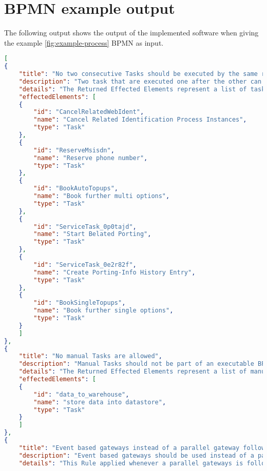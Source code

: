 \section{BPMN example output}\label{app-1}
The following output shows the output of the implemented software when giving the example \ref{fig:example-process} BPMN as input.
\begin{lstlisting}[breaklines=true, language=json]
[
{
	"title": "No two consecutive Tasks should be executed by the same resource",
	"description": "Two task that are executed one after the other can be merged if they have the same enitity executing the Task. In case of User tasks this means the same usergroup is executing this task. Automated Tasks that follow each other should also always be merged to minimize flownodes.",
	"details": "The Returned Effected Elements represent a list of tasks that can be merged with its direct successor.In case that three or more tasks can be merged, this algorithm will return every Task that can be mergedwith its successor on its own. Therefore if \"task1\" , \"task2\" and \"task3\" can be merged all together, this algorithm will \"task2\" and \"task3\" as effected elements",
	"effectedElements": [
	{
		"id": "CancelRelatedWebIdent",
		"name": "Cancel Related Identification Process Instances",
		"type": "Task"
	},
	{
		"id": "ReserveMsisdn",
		"name": "Reserve phone number",
		"type": "Task"
	},
	{
		"id": "BookAutoTopups",
		"name": "Book further multi options",
		"type": "Task"
	},
	{
		"id": "ServiceTask_0p0tajd",
		"name": "Start Belated Porting",
		"type": "Task"
	},
	{
		"id": "ServiceTask_0e2r82f",
		"name": "Create Porting-Info History Entry",
		"type": "Task"
	},
	{
		"id": "BookSingleTopups",
		"name": "Book further single options",
		"type": "Task"
	}
	]
},
{
	"title": "No manual Tasks are allowed",
	"description": "Manual Tasks should not be part of an executable BPMN diagram",
	"details": "The Returned Effected Elements represent a list of manual tasks in the given diagram",
	"effectedElements": [
	{
		"id": "data_to_warehouse",
		"name": "store data into datastore",
		"type": "Task"
	}
	]
},
{
	"title": "Event based gateways instead of a parallel gateway followed by exclusive gateways",
	"description": "Event based gateways should be used instead of a parallel gateway followed by one or more exclusive gateways",
	"details": "This Rule applied whenever a parallel gateways is followed by one or more exclusive gateways. The returned Effected Elements are a list of parallel gateways that are followed by one or more exclusive gateways in the given diagram",

\end{lstlisting}
